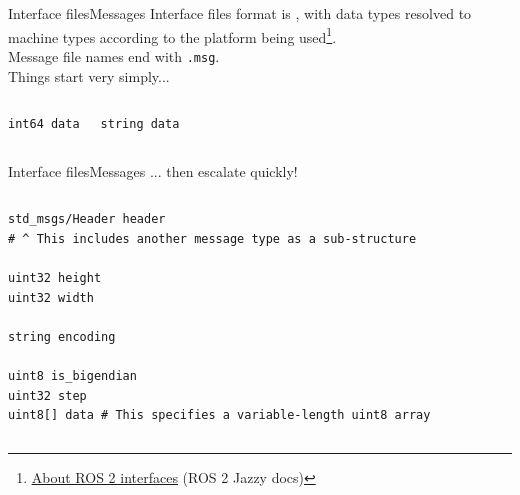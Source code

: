 \begin{frame}[fragile]{Interface files}{Messages}
	\justifying
	Interface files format is , with data types resolved to machine types according to the platform being used\footnote{\href{https://docs.ros.org/en/jazzy/Concepts/About-ROS-Interfaces.html}{\color{blue}\underline{About ROS 2 interfaces}} (ROS 2 Jazzy docs)}.\\
  \medskip
	Message file names end with \texttt{.msg}.\\
  \medskip
	Things start very simply...

	\begin{columns}
		\begin{lstlisting}[language=ros2msg, caption=Definition of the \texttt{std\_msgs/msg/Int64} message.]
int64 data
    \end{lstlisting}

		\begin{lstlisting}[language=ros2msg, caption=Definition of the \texttt{std\_msgs/msg/String} message.]
string data
    \end{lstlisting}
	\end{columns}
\end{frame}
\begin{frame}[fragile]{Interface files}{Messages}
	\justifying
	... then escalate quickly!

	\begin{columns}
		\column{.9\textwidth}
		\begin{lstlisting}[language=ros2msg, caption=Definition of the \texttt{sensor\_msgs/msg/Image} nested message.]
std_msgs/Header header
# ^ This includes another message type as a sub-structure

uint32 height
uint32 width

string encoding

uint8 is_bigendian
uint32 step
uint8[] data # This specifies a variable-length uint8 array
    \end{lstlisting}
	\end{columns}
\end{frame}
